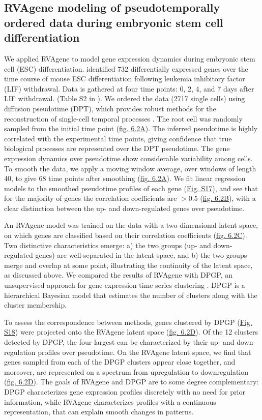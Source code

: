 \subsection{RVAgene modeling of pseudotemporally ordered data during embryonic stem cell differentiation}

We applied RVAgene to model gene expression dynamics during embryonic stem cell (ESC)
differentiation. \citet{Klein2015} identified 732 differentially expressed genes over the time
course of mouse ESC differentiation following leukemia inhibitory factor (LIF) withdrawal. Data is
gathered at four time points: 0, 2, 4, and 7 days after LIF withdrawal. (Table S2 in
\citet{Klein2015}). We ordered the data (2717 single cells) using diffusion pseudotime (DPT), which
provides robust methods for the reconstruction of single-cell temporal processes
\citep{haghverdi2016diffusion}. The root cell was randomly sampled from the initial time point
(\hyperref[fig:fig3]{fig. 6.2A}). The inferred pseudotime is highly correlated with the experimental
time points, giving confidence that true biological processes are represented over the DPT
pseudotime. The gene expression dynamics over pseudotime show considerable variability among cells.
To smooth the data, we apply a moving window average, over windows of length 40, to give 68 time
points after smoothing (\hyperref[fig:fig3]{fig. 6.2A}). 
We fit linear regression models to the smoothed pseudotime profiles of each gene
(\hyperref[fig:figS2]{Fig. S17}), and see that for the majority of genes the correlation coefficients are
$> 0.5$ (\hyperref[fig:fig3]{fig. 6.2B}), with a clear distinction between the up- and down-regulated genes over pseudotime.
\par 
An RVAgene model was trained on the data with a two-dimensional latent space, on which genes are
classified based on their correlation coefficients  (\hyperref[fig:fig3]{fig. 6.2C}). Two distinctive characteristics emerge: a) the two groups (up- and down-regulated genes) are well-separated in the latent space, and b) the two groups merge and overlap at some point, illustrating the continuity of the latent space, as discussed above. 
We compared the results of RVAgene with DPGP, an unsupervised approach for gene expression time series clustering \citep{McDowell2018}. DPGP is a hierarchical Bayesian model that estimates the number of clusters along with the cluster membership.

To assess the correspondence between methods, genes clustered by DPGP (\hyperref[fig:figS3]{Fig. S18})
were projected onto the RVAgene latent space (\hyperref[fig:fig3]{fig. 6.2D}). Of the 12 clusters
detected by DPGP, the four largest can be characterized by their up- and down-regulation profiles
over pseudotime. On the RVAgene latent space, we find that genes sampled from each of the DPGP
clusters appear close together, and moreover, are represented on a spectrum from upregulation to
downregulation (\hyperref[fig:fig3]{fig. 6.2D}). The goals of RVAgene and DPGP are to some degree complementary: DPGP characterizes gene expression profiles discretely with no need for prior information, while RVAgene characterizes profiles with a continuous representation, that can explain smooth changes in patterns.

